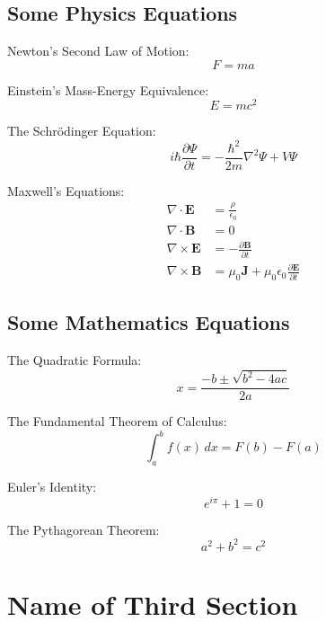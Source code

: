 \subsection{Some Physics Equations}

Newton's Second Law of Motion:
\begin{equation}
F = ma
\end{equation}

Einstein's Mass-Energy Equivalence:
\begin{equation}
E=mc^2
\end{equation}

The Schrödinger Equation:
\begin{equation}
i\hbar \frac{\partial \Psi}{\partial t} = -\frac{\hbar^2}{2m} \nabla^2 \Psi + V \Psi
\end{equation}

Maxwell's Equations:
\begin{align}
\nabla \cdot \mathbf{E} &= \frac{\rho}{\epsilon_0} \\
\nabla \cdot \mathbf{B} &= 0 \\
\nabla \times \mathbf{E} &= -\frac{\partial \mathbf{B}}{\partial t} \\
\nabla \times \mathbf{B} &= \mu_0\mathbf{J} + \mu_0\epsilon_0 \frac{\partial \mathbf{E}}{\partial t}
\end{align}

\subsection{Some Mathematics Equations}

The Quadratic Formula:
\begin{equation}
x = \frac{-b \pm \sqrt{b^2 - 4ac}}{2a}
\end{equation}

The Fundamental Theorem of Calculus:
\begin{equation}
\int_a^b f(x) \, dx = F(b) - F(a)
\end{equation}

Euler's Identity:
\begin{equation}
e^{i\pi} + 1 = 0
\end{equation}

The Pythagorean Theorem:
\begin{equation}
a^2 + b^2 = c^2
\end{equation}

\section{Name of Third Section}
